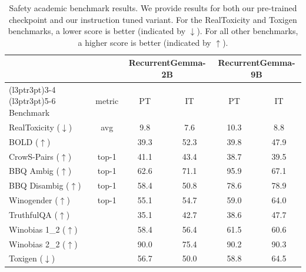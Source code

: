 \documentclass[9pt, a4paper, logo, twocolumn, copyright, nonumbering]{googledeepmind}
\begin{document}
\begin{table}[t]
\vspace{-2mm}
    \centering
        \caption{Safety academic benchmark results. We provide results for both our pre-trained checkpoint and our instruction tuned variant. For the RealToxicity and Toxigen benchmarks, a lower score is better (indicated by $\downarrow$). For all other benchmarks, a higher score is better (indicated by $\uparrow$).}
    \begin{tabular}{lccccc}
    \toprule
    & & \multicolumn{2}{c}{RecurrentGemma-2B} & \multicolumn{2}{c}{RecurrentGemma-9B} \\
    \cmidrule(l{3pt}r{3pt}){3-4} \cmidrule(l{3pt}r{3pt}){5-6}
    Benchmark & metric & PT & IT & PT & IT \\
      \midrule
    RealToxicity ($\downarrow$) & avg & 9.8 & 7.6 & 10.3 & 8.8 \\  %
    BOLD ($\uparrow$) &  & 39.3 & 52.3 & 39.8 & 47.9  \\  %
    CrowS-Pairs ($\uparrow$) & top-1 & 41.1 & 43.4 & 38.7 & 39.5 \\  %
    BBQ Ambig ($\uparrow$) & top-1 & 62.6 & 71.1 & 95.9 & 67.1 \\  %
    BBQ Disambig ($\uparrow$) & top-1 & 58.4 & 50.8 & 78.6 & 78.9 \\  %
    Winogender ($\uparrow$) & top-1 & 55.1 & 54.7 & 59.0 & 64.0 \\  %
    TruthfulQA ($\uparrow$) & & 35.1 & 42.7 & 38.6 & 47.7 \\  %
    Winobias 1\_2 ($\uparrow$) & & 58.4 & 56.4 & 61.5 & 60.6 \\  %
    Winobias 2\_2 ($\uparrow$) &  & 90.0 & 75.4 & 90.2 & 90.3 \\  %
    Toxigen ($\downarrow$) &  & 56.7 & 50.0 & 58.8 & 64.5 \\  %
    \bottomrule
    \end{tabular}
    \label{tab:safety_auto_evals}
\end{table}
\end{document}

